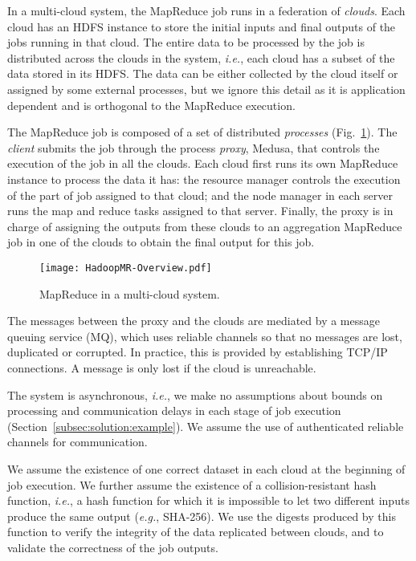 \documentclass[10pt, conference, compsocconf]{IEEEtran}
\begin{document}
In a multi-cloud system, the MapReduce job runs in a federation of \emph{clouds}. Each cloud has an HDFS instance to store the initial inputs and final outputs of the jobs running in that cloud.
The entire data to be processed by the job is distributed across the clouds in the system, \textit{i.e.}, each cloud has a subset of the data stored in its HDFS. The data can be either collected by the cloud itself or assigned by some external processes, but we ignore this detail as it is application dependent and is orthogonal to the MapReduce execution.

The MapReduce job is composed of a set of distributed \emph{processes} (Fig.~\ref{fig:hadoop:manager:usecase}). The \emph{client} submits the job through the process \emph{proxy}, Medusa, that controls the execution of the job in all the clouds. Each cloud first runs its own MapReduce instance to process the data it has: the resource manager controls the execution of the part of job assigned to that cloud; and the node manager in each server runs the map and reduce tasks assigned to that server. Finally, the proxy is in charge of assigning the outputs from these clouds to an aggregation MapReduce job in one of the clouds to obtain the final output for this job.

\begin{figure}[!tb]
  \centering
  \texttt{[image: HadoopMR-Overview.pdf]}
  \caption{MapReduce in a multi-cloud system.}
  \label{fig:hadoop:manager:usecase}
  \vspace{1em}
\end{figure}

The messages between the proxy and the clouds are mediated by a message queuing service (MQ), which uses reliable channels so that no messages are lost, duplicated or corrupted.
In practice, this is provided by establishing TCP/IP connections.
A message is only lost if the cloud is unreachable.

The system is asynchronous, \textit{i.e.}, we make no assumptions about bounds on processing and communication delays in each stage of job execution (Section~\ref{subsec:solution:example}).
We assume the use of authenticated reliable channels for communication.

We assume the existence of one correct dataset in each cloud at the beginning of job execution.
We further assume the existence of a collision-resistant hash function, \textit{i.e.}, a hash function for which it is impossible to let two different inputs produce the same output (\textit{e.g.}, SHA-256).
We use the digests produced by this function to verify the integrity of the data replicated between clouds, and to validate the correctness of the job outputs.
\end{document}
